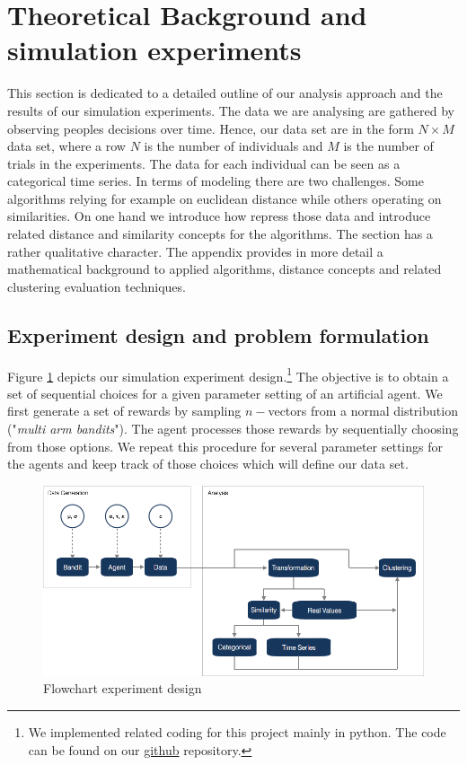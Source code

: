 \documentclass[12pt,a4paper,bibliography=totocnumbered,listof=totocnumbered]{scrartcl}
\begin{document}
\pagebreak

\section{Theoretical Background and simulation experiments}

This section is dedicated to a detailed outline of our analysis approach and the results of our simulation experiments. The data we are analysing are gathered by observing peoples decisions over time. Hence, our data set are in the form $N \times M$ data set, where a row $N$ is the number of individuals and $M$ is the number of trials in the experiments. The data for each individual can be seen as a categorical time series. In terms of modeling there are two challenges. Some algorithms relying for example on euclidean distance while others operating on similarities. On one hand we introduce how repress those data and introduce related distance and similarity concepts for the algorithms. The section has a rather qualitative character. The appendix provides in more detail a mathematical background to applied algorithms, distance concepts and related clustering evaluation techniques. 

\subsection{Experiment design and problem formulation}

Figure \ref{fig:flow} depicts our simulation experiment design.\footnote{We implemented related coding for this project mainly in python. The code can be found on our  \href{https://github.com/FelixGSE/Master-Project}{github} repository.} The objective is to obtain a set of sequential choices for a given parameter setting of an artificial agent. We first generate a set of rewards by sampling $n-$vectors from a normal distribution ("\textit{multi arm bandits}"). The agent processes those rewards by sequentially choosing from those options. We repeat this procedure for several parameter settings for the agents and keep track of those choices which will define our data set.

 \begin{figure}[!htb]
	\includegraphics[width=\textwidth]{Pictures/flow01.png}
	\caption{Flowchart experiment design}
	\label{fig:flow}
\end{figure}
\end{document}
